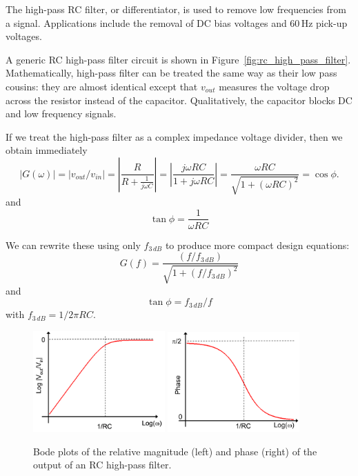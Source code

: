 \documentclass{article}
\begin{document}
The high-pass RC filter, or differentiator, is used to remove low frequencies from a signal. Applications include the removal of DC bias voltages and 60\,Hz pick-up voltages.

A generic RC high-pass filter circuit is shown in Figure~\ref{fig:rc_high_pass_filter}. Mathematically, high-pass filter can be treated the same way as their low pass cousins: they are almost identical except that $v_{out}$ measures the voltage drop across the resistor instead of the capacitor. Qualitatively, the capacitor blocks DC and low frequency signals.

If we treat the high-pass filter as a complex impedance voltage divider, then we obtain immediately
\begin{equation}
|G(\omega)| = |v_{out} / v_{in}| = \left|\frac{R}{R + \frac{1}{j\omega C}}\right| = \left|\frac{j\omega RC}{1+j\omega RC}\right| = \frac{\omega RC}{\sqrt{1 + (\omega R C)^2}} = \cos\phi.
\end{equation}
and
\begin{equation}
\tan\phi = \frac{1}{\omega RC}
\end{equation}

We can rewrite these using only $f_{3\,dB}$ to produce more compact design equations:
\begin{equation}
G(f) = \frac{(f/f_{3\,dB})}{\sqrt{1 + (f/f_{3\,dB})^2}}
\end{equation}
and
\begin{equation}
\tan\phi = f_{3\,dB}/f
\end{equation}
with $f_{3\,dB} = 1/2\pi RC$.

\begin{figure}
\begin{center}
\includegraphics[width=0.45\textwidth]{pics/rc_high_pass_filter_bode_plot_magnitude}
\quad
\includegraphics[width=0.45\textwidth]{pics/rc_high_pass_filter_bode_plot_phase}
\end{center}
\caption{Bode plots of the relative magnitude (left) and phase (right) of the output of an RC high-pass filter.}
\label{fig:rc_high_pass_filter_bode_plot}
\end{figure}
\end{document}
